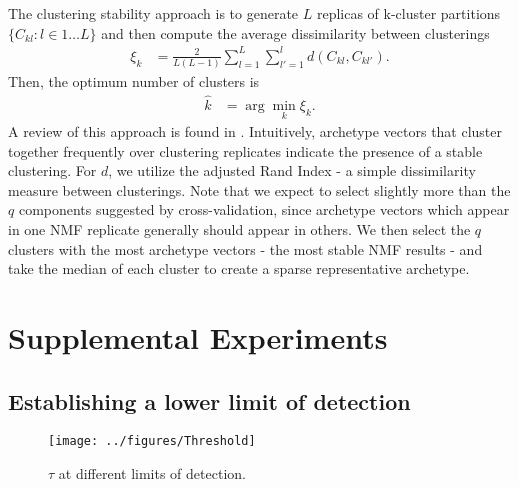The clustering stability approach is to generate $L$ replicas of k-cluster partitions $\{C_{kl} : l \in 1 \dots L\}$ and then compute the average dissimilarity between clusterings
\begin{align*}
\xi_k &= \frac{2}{L(L - 1)} \sum_{l = 1}^{L} \sum_{l'= 1}^{l}  d(C_{kl}, C_{kl'}).
\end{align*}
Then, the optimum number of clusters is 
\begin{align*}
\hat k &= \arg \min_k \xi_k.
\end{align*}
A review of this approach is found in \citet{Von_Luxburg2010-qe}.
Intuitively, archetype vectors that cluster together frequently over clustering replicates indicate the presence of a stable clustering.
For $d$, we utilize the adjusted Rand Index - a simple dissimilarity measure between clusterings.
Note that we expect to select slightly more than the $q$ components suggested by cross-validation, since archetype vectors which appear in one NMF replicate generally should appear in others.
We then select the $q$ clusters with the most archetype vectors - the most stable NMF results - and take the median of each cluster to create a sparse representative archetype.









\newpage

\section{Supplemental Experiments}

\subsection{Establishing a lower limit of detection}
\label{supp:exp_lower}

\begin{figure}[H]
    \centering
    \texttt{[image: ../figures/Threshold]}
    \label{fig:threshold}
    \caption{$\tau$ at different limits of detection.}
\end{figure}


